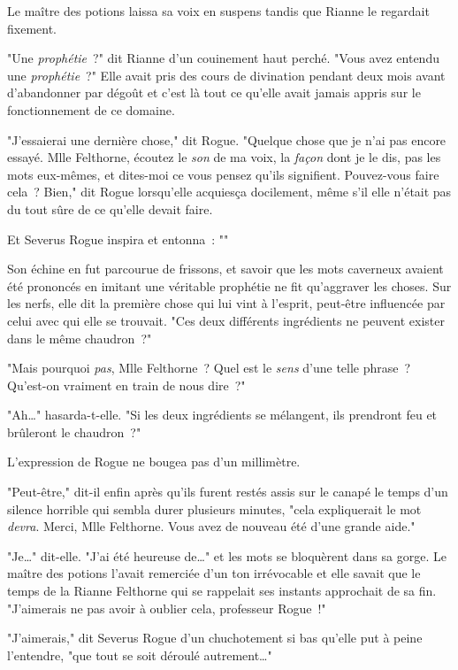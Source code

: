 Le maître des potions laissa sa voix en suspens tandis que Rianne le regardait fixement.

"Une \emph{prophétie}~?" dit Rianne d'un couinement haut perché. "Vous avez entendu une \emph{prophétie}~?" Elle avait pris des cours de divination pendant deux mois avant d'abandonner par dégoût et c'est là tout ce qu'elle avait jamais appris sur le fonctionnement de ce domaine.

"J'essaierai une dernière chose," dit Rogue. "Quelque chose que je n'ai pas encore essayé. Mlle Felthorne, écoutez le \emph{son} de ma voix, la \emph{façon} dont je le dis, pas les mots eux-mêmes, et dites-moi ce vous pensez qu'ils signifient. Pouvez-vous faire cela~? Bien," dit Rogue lorsqu'elle acquiesça docilement, même s'il elle n'était pas du tout sûre de ce qu'elle devait faire.

Et Severus Rogue inspira et entonna~: ""

Son échine en fut parcourue de frissons, et savoir que les mots caverneux avaient été prononcés en imitant une véritable prophétie ne fit qu'aggraver les choses. Sur les nerfs, elle dit la première chose qui lui vint à l'esprit, peut-être influencée par celui avec qui elle se trouvait. "Ces deux différents ingrédients ne peuvent exister dans le même chaudron~?"

"Mais pourquoi \emph{pas}, Mlle Felthorne~? Quel est le \emph{sens} d'une telle phrase~? Qu'est-on vraiment en train de nous dire~?"

"Ah…" hasarda-t-elle. "Si les deux ingrédients se mélangent, ils prendront feu et brûleront le chaudron~?"

L'expression de Rogue ne bougea pas d'un millimètre.

"Peut-être," dit-il enfin après qu'ils furent restés assis sur le canapé le temps d'un silence horrible qui sembla durer plusieurs minutes, "cela expliquerait le mot \emph{devra}. Merci, Mlle Felthorne. Vous avez de nouveau été d'une grande aide."

"Je…" dit-elle. "J'ai été heureuse de…" et les mots se bloquèrent dans sa gorge. Le maître des potions l'avait remerciée d'un ton irrévocable et elle savait que le temps de la Rianne Felthorne qui se rappelait ses instants approchait de sa fin. "J'aimerais ne pas avoir à oublier cela, professeur Rogue~!"

"J'aimerais," dit Severus Rogue d'un chuchotement si bas qu'elle put à peine l'entendre, "que tout se soit déroulé autrement…"

